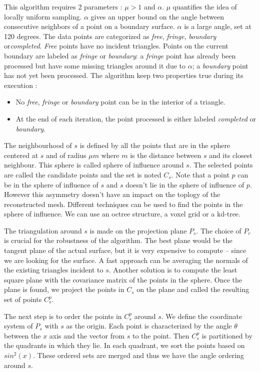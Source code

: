 \documentclass[a4paper]{article}
\begin{document}
This algorithm requires 2 parameters : $\mu > 1$ and $\alpha$. $\mu$ quantifies the idea of locally uniform sampling. $\alpha$ gives an upper bound on the angle between consecutive neighbors of a point on a boundary surface. $\alpha$ is a large angle, set at 120 degrees. The data points are categorized as \textit{free}, \textit{fringe}, \textit{boundary} or\textit{completed}. \textit{Free} points have no incident triangles. Points on the current boundary are labeled as \textit{fringe} or \textit{boundary}: a \textit{fringe} point has already been processed but have some missing triangles around it due to $\alpha$; a \textit{boundary} point has not yet been processed. The algorithm keep two properties true during its execution :
\begin{itemize}
\item No \textit{free}, \textit{fringe} or \textit{boundary} point can be in the interior of a triangle.
\item At the end of each iteration, the point processed is either labeled \textit{completed} or \textit{boundary}.
\end{itemize}

The neighbourhood of $s$ is defined by all the points that are in the sphere centered at $s$ and of radius $\mu m$ where $m$ is the distance between $s$ and its closest neighbour. This sphere is called sphere of influence around $s$. The selected points are called the candidate points and the set is noted $C_s$. Note that a point $p$ can be in the sphere of influence of $s$ and $s$ doesn't lie in the sphere of influence of $p$. However this asymmetry doesn't have an impact on the toplogy of the reconstructed mesh. Different techniques can be used to find the points in the sphere of influence. We can use an octree structure, a voxel grid or a kd-tree.

The triangulation around $s$ is made on the projection plane $P_s$. The choice of $P_r$ is crucial for the robustness of the algorithm. The best plane would be the tangent plane of the actual surface, but it is very expensive to compute -- since we are looking for the surface. A fast approach can be averaging the normals of the existing triangles incident to $s$. Another solution is to compute the least square plane with the covariance matrix of the points in the sphere. Once the plane is found, we project the points in $C_s$ on the plane and called the resulting set of points $C^p_s$.

The next step is to order the points in $C^p_s$ around $s$. We define the coordinate system of $P_s$ with $s$ as the origin. Each point is characterized by the angle $\theta$ between the $x$ axis and the vector from $s$ to the point. Then $C^p_s$ is partitioned by the quadrants in which they lie. In each quadrant, we sort the points based on $sin^2(x)$. These ordered sets are merged and thus we have the angle ordering around $s$.
\end{document}
